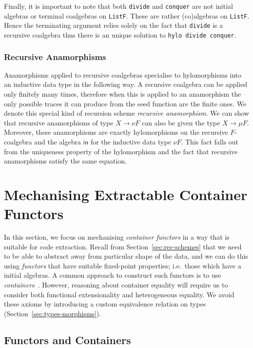 \documentclass{llncs}
\newcommand{\operator}[1]{\textsf{#1}}
\newcommand{\InIso}{\operator{in}}
\begin{document}
Finally, it is important to note that both  \texttt{divide} and
\texttt{conquer} are not initial algebras or terminal coalgebras on
\texttt{ListF}. These are rather (co)algebras on
\texttt{ListF}.  Hence the terminating argument relies solely on
the fact that \texttt{divide} is a recursive coalgebra thus there
is an unique solution to \texttt{hylo divide conquer}.

\subsubsection{Recursive Anamorphisms}
Anamorphisms applied to recursive coalgebras specialise to hylomorphisms into an
inductive data type in the following way. A recursive coalgebra
can be applied only finitely many times, therefore when this is applied to an
anamorphism the only possible traces it can produce from the seed function are
the finite ones. We denote this special kind of recursion scheme \emph{recursive
anamorphism}. We can show that recursive anamorphisms of type $X \to \nu F$
can also be given the type $X \to \mu F$. Moreover, these anamorphisms are
exactly hylomorphisms on the recursive $F$-coalgebra and the
algebra $\InIso$ for the inductive data type $\nu F$. This fact falls out
from the uniqueness property of the hylomorphism and the fact that recursive
anamorphisms satisfy the same equation.



\section{Mechanising Extractable Container Functors}
\label{sec:containers}

In this section, we focus on mechanising \emph{container functors} in a way that
is suitable for code extraction. Recall from Section~\ref{sec:rec-schemes} that
we need to be able to abstract away from particular shape of the data, and we
can do this using \emph{functors} that have suitable fixed-point properties;
i.e.\ those which have a initial algebras.
%
A common approach to construct such functors is to use
\emph{containers}~\cite{AbbottAG05}. However, reasoning about container equality
will require us to consider both functional extensionality and heterogeneous
equality. We avoid these axioms by introducing a custom equivalence relation on
types (Section~\ref{sec:types-morphisms}).

\subsection{Functors and Containers}
\label{sec:functors}
\end{document}
